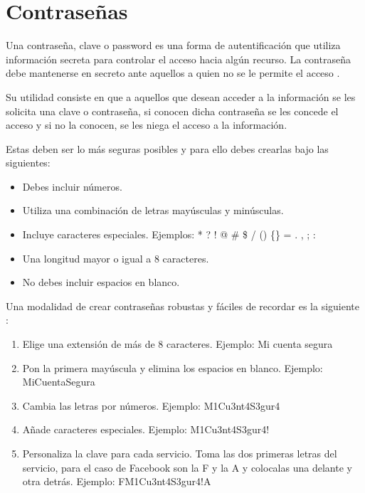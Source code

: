 \documentclass[
  a4paper,
  openany]{book}
\begin{document}
\hypertarget{contraseuxf1as}{%
\section{Contraseñas}\label{contraseuxf1as}}

Una contraseña, clave o password es una forma de autentificación que utiliza información secreta para controlar el acceso hacia algún recurso. La contraseña debe mantenerse en secreto ante aquellos a quien no se le permite el acceso \citep{WIKI-password}.

Su utilidad consiste en que a aquellos que desean acceder a la información se les solicita una clave o contraseña, si conocen dicha contraseña se les concede el acceso y si no la conocen, se les niega el acceso a la información.

Estas deben ser lo más seguras posibles y para ello debes crearlas bajo las siguientes:

\begin{itemize}
\item
  Debes incluir números.
\item
  Utiliza una combinación de letras mayúsculas y minúsculas.
\item
  Incluye caracteres especiales. Ejemplos: * ? ! @ \# \$ / () \{\} = . , ; :
\item
  Una longitud mayor o igual a 8 caracteres.
\item
  No debes incluir espacios en blanco.
\end{itemize}

Una modalidad de crear contraseñas robustas y fáciles de recordar es la siguiente \citep{OSI-contraseñas}:

\begin{enumerate}
\def\labelenumi{\arabic{enumi}.}
\item
  Elige una extensión de más de 8 caracteres. Ejemplo: Mi cuenta segura
\item
  Pon la primera mayúscula y elimina los espacios en blanco. Ejemplo: MiCuentaSegura
\item
  Cambia las letras por números. Ejemplo: M1Cu3nt4S3gur4
\item
  Añade caracteres especiales. Ejemplo: M1Cu3nt4S3gur4!
\item
  Personaliza la clave para cada servicio. Toma las dos primeras letras del servicio, para el caso de Facebook son la F y la A y colocalas una delante y otra detrás. Ejemplo: FM1Cu3nt4S3gur4!A
\end{enumerate}
\end{document}
